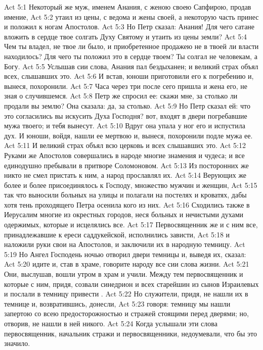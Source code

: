 \vs Act 5:1 Некоторый же муж, именем Анания, с женою своею Сапфирою, продав имение,
\vs Act 5:2 утаил из цены, с ведома и жены своей, а некоторую часть принес и положил к ногам Апостолов.
\vs Act 5:3 Но Петр сказал: Анания! Для чего  сатане вложить в сердце твое  солгать Духу Святому и утаить из цены земли?
\vs Act 5:4 Чем ты владел, не твое ли было, и приобретенное продажею не в твоей ли власти находилось? Для чего ты положил это в сердце твоем? Ты солгал не человекам, а Богу.
\vs Act 5:5 Услышав сии слова, Анания пал бездыханен; и великий страх объял всех, слышавших это.
\vs Act 5:6 И встав, юноши приготовили его к погребению и, вынеся, похоронили.
\vs Act 5:7 Часа через три после сего пришла и жена его, не зная о случившемся.
\vs Act 5:8 Петр же спросил ее: скажи мне, за столько ли продали вы землю? Она сказала: да, за столько.
\vs Act 5:9 Но Петр сказал ей: что это согласились вы искусить Духа Господня? вот, входят в двери погребавшие мужа твоего; и тебя вынесут.
\vs Act 5:10 Вдруг она упала у ног его и испустила дух. И юноши, войдя, нашли ее мертвою и, вынеся, похоронили подле мужа ее.
\vs Act 5:11 И великий страх объял всю церковь и всех слышавших это.
\rsbpar\vs Act 5:12 Руками же Апостолов совершались в народе многие знамения и чудеса; и все единодушно пребывали в притворе Соломоновом.
\vs Act 5:13 Из посторонних же никто не смел пристать к ним, а народ прославлял их.
\vs Act 5:14 Верующих же более и более присоединялось к Господу, множество мужчин и женщин,
\vs Act 5:15 так что выносили больных на улицы и полагали на постелях и кроватях, дабы хотя тень проходящего Петра осенила кого из них.
\vs Act 5:16 Сходились также в Иерусалим многие из окрестных городов, неся больных и нечистыми духами одержимых, которые и исцелялись все.
\rsbpar\vs Act 5:17 Первосвященник же и с ним все, принадлежавшие к ереси саддукейской, исполнились зависти,
\vs Act 5:18 и наложили руки свои на Апостолов, и заключили их в народную темницу.
\vs Act 5:19 Но Ангел Господень ночью отворил двери темницы и, выведя их, сказал:
\vs Act 5:20 идите и, став в храме, говорите народу все сии слова жизни.
\vs Act 5:21 Они, выслушав, вошли утром в храм и учили. Между тем первосвященник и которые с ним, придя, созвали синедрион и всех старейшин из сынов Израилевых и послали в темницу привести .
\vs Act 5:22 Но служители, придя, не нашли их в темнице и, возвратившись, донесли,
\vs Act 5:23 говоря: темницу мы нашли запертою со всею предосторожностью и стражей стоящими перед дверями; но, отворив, не нашли в ней никого.
\vs Act 5:24 Когда услышали эти слова первосвященник, начальник стражи и  первосвященники, недоумевали, что бы это значило.
